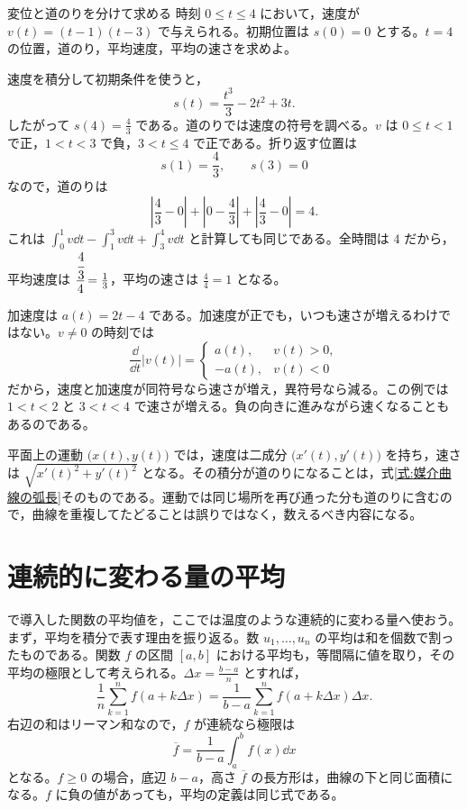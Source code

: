 \begin{example}{変位と道のりを分けて求める}
時刻 $0\leq t\leq4$ において，速度が $v(t)=(t-1)(t-3)$ で与えられる。初期位置は $s(0)=0$ とする。$t=4$ の位置，道のり，平均速度，平均の速さを求めよ。
\end{example}

速度を積分して初期条件を使うと，
\[
s(t)=\frac{t^3}{3}-2t^2+3t.
\]
したがって $s(4)=\frac43$ である。道のりでは速度の符号を調べる。$v$ は $0\leq t<1$ で正，$1<t<3$ で負，$3<t\leq4$ で正である。折り返す位置は
\[
s(1)=\frac43,\qquad s(3)=0
\]
なので，道のりは
\[
\left|\frac43-0\right|+\left|0-\frac43\right|
 +\left|\frac43-0\right|=4.
\]
これは $\int_0^1v\dd t-\int_1^3v\dd t+\int_3^4v\dd t$ と計算しても同じである。全時間は $4$ だから，平均速度は $\cfrac{\cfrac43}{4}=\frac13$，平均の速さは $\frac44=1$ となる。

加速度は $a(t)=2t-4$ である。加速度が正でも，いつも速さが増えるわけではない。$v\ne0$ の時刻では
\[
\frac{\dd}{\dd t}|v(t)|=
\begin{cases}
a(t),&v(t)>0,\\
-a(t),&v(t)<0
\end{cases}
\]
だから，速度と加速度が同符号なら速さが増え，異符号なら減る。この例では $1<t<2$ と $3<t<4$ で速さが増える。負の向きに進みながら速くなることもあるのである。

平面上の運動 $\bigl(x(t),y(t)\bigr)$ では，速度は二成分 $\bigl(x'(t),y'(t)\bigr)$ を持ち，速さは $\sqrt{x'(t)^2+y'(t)^2}$ となる。その積分が道のりになることは，式\eqref{式:媒介曲線の弧長}そのものである。運動では同じ場所を再び通った分も道のりに含むので，曲線を重複してたどることは誤りではなく，数えるべき内容になる。

\section{連続的に変わる量の平均}\label{節:関数の平均}

で導入した関数の平均値を，ここでは温度のような連続的に変わる量へ使おう。まず，平均を積分で表す理由を振り返る。数 $u_1,\ldots,u_n$ の平均は和を個数で割ったものである。関数 $f$ の区間 $[a,b]$ における平均も，等間隔に値を取り，その平均の極限として考えられる。$\Delta x=\frac{b-a}{n}$ とすれば，
\[
\frac1n\sum_{k=1}^n f(a+k\Delta x)
 =\frac{1}{b-a}\sum_{k=1}^n f(a+k\Delta x)\Delta x.
\]
右辺の和はリーマン和なので，$f$ が連続なら極限は
\begin{equation}\label{式:関数の平均値}
\overline f=\frac{1}{b-a}\int_a^b f(x)\dd x
\end{equation}
となる。$f\geq0$ の場合，底辺 $b-a$，高さ $\overline f$ の長方形は，曲線の下と同じ面積になる。$f$ に負の値があっても，平均の定義は同じ式である。

